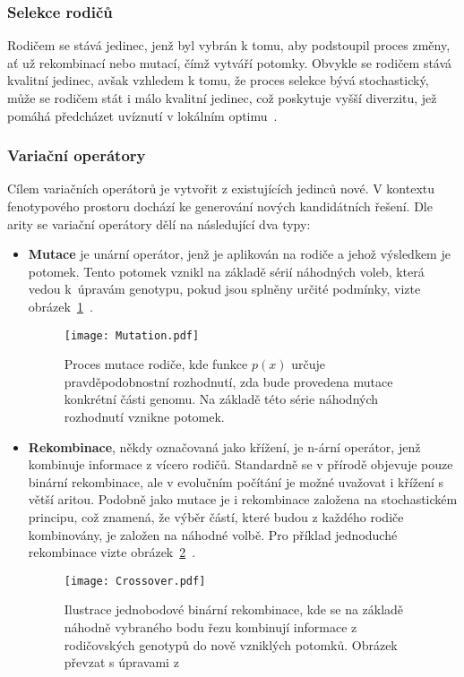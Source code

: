\subsubsection*{Selekce rodičů}
Rodičem se stává jedinec, jenž byl vybrán k tomu, aby podstoupil proces změny, ať už rekombinací nebo mutací, čímž vytváří potomky. 
        Obvykle se rodičem stává kvalitní jedinec, avšak vzhledem k tomu, že proces selekce bývá stochastický, může se rodičem stát i málo kvalitní jedinec, což poskytuje vyšší diverzitu, jež pomáhá předcházet uvíznutí v lokálním optimu~\cite{IntroductionToEvoComputing}. 
\subsubsection*{Variační operátory}
Cílem variačních operátorů je vytvořit z existujících jedinců nové. 
V kontextu fenotypového prostoru dochází ke generování nových kandidátních řešení. 
Dle arity se variační operátory dělí na následující dva typy:
\begin{itemize}
    \item \textbf{Mutace} je unární operátor, jenž je aplikován na rodiče a jehož výsledkem je potomek. 
        Tento potomek vznikl na základě sérií náhodných voleb, která vedou k~úpravám genotypu, pokud jsou splněny určité podmínky, vizte obrázek~\ref{fig:mutation}~\cite{IntroductionToEvoComputing,NaturalComputing}. 
        \begin{figure}[ht!]
            \centering
            \texttt{[image: Mutation.pdf]}
            \caption{Proces mutace rodiče, kde funkce $p(x)$ určuje pravděpodobnostní rozhodnutí, zda bude provedena mutace konkrétní části genomu. Na základě této série náhodných rozhodnutí vznikne potomek.}
            \label{fig:mutation}
        \end{figure}
    \item \textbf{Rekombinace}, někdy označovaná jako křížení, je n-ární operátor, jenž kombinuje informace z vícero rodičů. 
        Standardně se v přírodě objevuje pouze binární rekombinace, ale v evolučním počítání je možné uvažovat i křížení s větší aritou. 
        Podobně jako mutace je i rekombinace založena na stochastickém principu, což znamená, že výběr částí, které budou z každého rodiče kombinovány, je založen na náhodné volbě. 
        Pro příklad jednoduché rekombinace vizte obrázek~\ref{fig:crossover}~\cite{IntroductionToEvoComputing}. 
        \begin{figure}[ht!]
            \centering
            \texttt{[image: Crossover.pdf]}
            \caption{Ilustrace jednobodové binární rekombinace, kde se na základě náhodně vybraného bodu řezu kombinují informace z rodičovských genotypů do nově vzniklých potomků. Obrázek převzat s úpravami z~\cite{NaturalComputing}}
            \label{fig:crossover}
        \end{figure}
\end{itemize}
